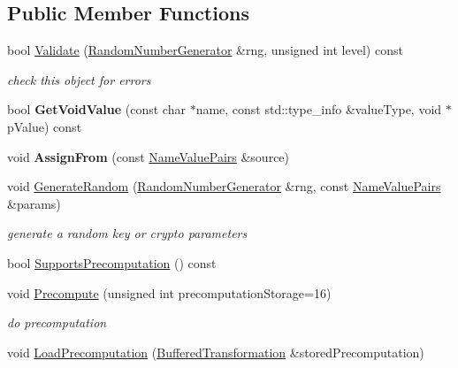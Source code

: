 \subsection*{Public Member Functions}
\begin{DoxyCompactItemize}
\item 
bool \hyperlink{class_d_l___private_key_impl_aa4ad7f55ea46d222c5e7e37f67bd20fe}{Validate} (\hyperlink{class_random_number_generator}{RandomNumberGenerator} \&rng, unsigned int level) const 
\begin{DoxyCompactList}\small\item\em check this object for errors \item\end{DoxyCompactList}\item 
\hypertarget{class_d_l___private_key_impl_a88475a3bb1dc0c478d0f0775eec41a26}{
bool {\bfseries GetVoidValue} (const char $\ast$name, const std::type\_\-info \&valueType, void $\ast$pValue) const }
\label{class_d_l___private_key_impl_a88475a3bb1dc0c478d0f0775eec41a26}

\item 
\hypertarget{class_d_l___private_key_impl_a1f477156648ec8d3cfe18d503f47a92f}{
void {\bfseries AssignFrom} (const \hyperlink{class_name_value_pairs}{NameValuePairs} \&source)}
\label{class_d_l___private_key_impl_a1f477156648ec8d3cfe18d503f47a92f}

\item 
void \hyperlink{class_d_l___private_key_impl_ab80a3771a5ef623677775f7c5dddb1e0}{GenerateRandom} (\hyperlink{class_random_number_generator}{RandomNumberGenerator} \&rng, const \hyperlink{class_name_value_pairs}{NameValuePairs} \&params)
\begin{DoxyCompactList}\small\item\em generate a random key or crypto parameters \item\end{DoxyCompactList}\item 
bool \hyperlink{class_d_l___private_key_impl_ae8e4b6e0d700c92852a0c3edbb9afaee}{SupportsPrecomputation} () const 
\item 
void \hyperlink{class_d_l___private_key_impl_ac1876a3d292e192186070869be896ded}{Precompute} (unsigned int precomputationStorage=16)
\begin{DoxyCompactList}\small\item\em do precomputation \item\end{DoxyCompactList}\item 
\hypertarget{class_d_l___private_key_impl_ae8acefe0a54ff6153d4ca5231ccac951}{
void \hyperlink{class_d_l___private_key_impl_ae8acefe0a54ff6153d4ca5231ccac951}{LoadPrecomputation} (\hyperlink{class_buffered_transformation}{BufferedTransformation} \&storedPrecomputation)}
\label{class_d_l___private_key_impl_ae8acefe0a54ff6153d4ca5231ccac951}


\end{DoxyCompactItemize}
